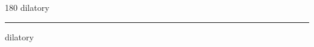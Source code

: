 
\begin{frame}
\begin{center}
\begin{turn}{180}
{\fontsize{2.5cm}{1em}\selectfont dilatory}
\end{turn}
\vspace{1em}\par  
\hrule
\vspace{1em}\par  
{\fontsize{2.5cm}{1em}\selectfont dilatory}
\end{center}
\end{frame}
